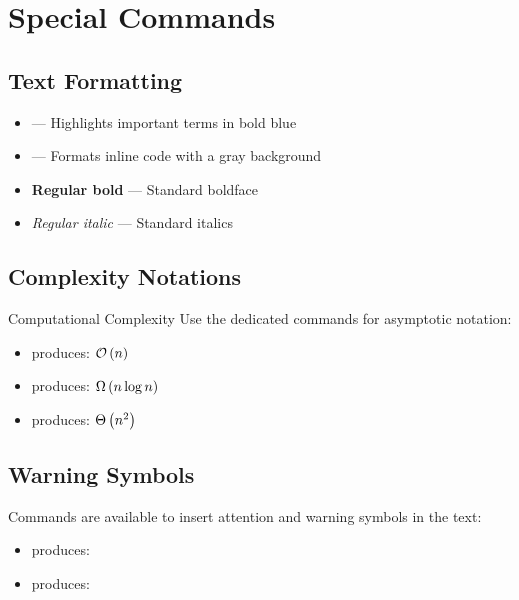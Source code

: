 \documentclass[]{csnotes}
\begin{document}

\section{Special Commands}

\subsection{Text Formatting}

\begin{itemize}
    \item {} --- Highlights important terms in bold blue
    \item {} --- Formats inline code with a gray background
    \item \textbf{Regular bold} --- Standard boldface
    \item \textit{Regular italic} --- Standard italics
\end{itemize}

\subsection{Complexity Notations}

\begin{example}{Computational Complexity}
Use the dedicated commands for asymptotic notation:
\begin{itemize}
    \item {} produces: \(\mathcal{O}\left(n\right)\)
    \item {} produces: \(\Omega\left(n \log n\right)\)
    \item {} produces: \(\Theta\left(n^2\right)\)
\end{itemize}
\end{example}

\subsection{Warning Symbols}

Commands are available to insert attention and warning symbols in the text:
\begin{itemize}
    \item {} produces: \warningsymbol
    \item {} produces: \infosymbol
\end{itemize}
\end{document}
